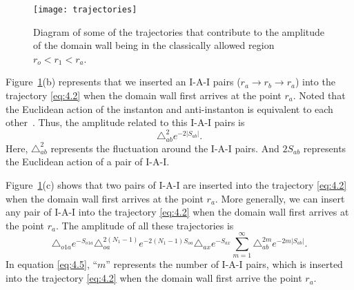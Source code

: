 \documentclass[12pt]{article}
\begin{document}
\begin{figure}[tbp]
\centering
\texttt{[image: trajectories]}
\caption{\label{fig:9} Diagram of some of the trajectories that contribute to the amplitude of the domain wall being in the classically allowed region $r_{o}<r_{1}<r_{a}$.}
\end{figure}

Figure~\ref{fig:9}(b) represents that we inserted an I-A-I pairs ($r_{a}\rightarrow r_{b}\rightarrow r_{a}$) into the trajectory \eqref{eq:4.2} when the domain wall \uppercase\expandafter{} first arrives at the point $r_{a}$. Noted that the Euclidean action of the instanton and anti-instanton is equivalent to each other~\cite{SC1,SC2,UHPP,RHB}. Thus, the amplitude related to this I-A-I pairs is
\begin{equation}
\label{eq:4.4}%
\triangle_{ab}^{2}e^{-2|S_{ab}|}.
\end{equation}
Here, $\triangle_{ab}^{2}$  represents the fluctuation  around the I-A-I pairs. And $2S_{ab}$ represents the Euclidean action of a pair of I-A-I.

Figure~\ref{fig:9}(c) shows that two pairs of I-A-I are inserted into the trajectory \eqref{eq:4.2} when the domain wall \uppercase\expandafter{} first arrives at the point $r_{a}$. More generally, we can insert any pair of I-A-I into the trajectory \eqref{eq:4.2} when the domain wall first arrives at the point $r_{a}$. The amplitude of all these trajectories is
\begin{equation}
\label{eq:4.5}%
\triangle_{o1a}e^{-S_{o1a}}\triangle_{oa}^{2(N_{1}-1)}e^{-2(N_{1}-1)S_{oa}}\triangle_{ax}e^{-S_{ax}}\sum_{m=1}^{\infty}\triangle_{ab}^{2m}e^{-2m|S_{ab}|}.
\end{equation}
In equation \eqref{eq:4.5}, ``$m$'' represents the number of I-A-I pairs, which is inserted into the trajectory \eqref{eq:4.2} when the domain wall \uppercase\expandafter{} first arrive the point $r_{a}$.
\end{document}
